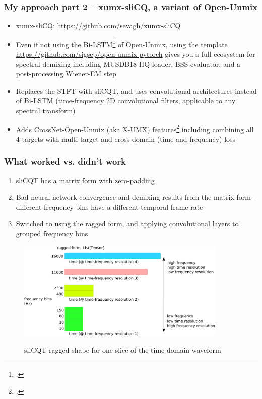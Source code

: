 \documentclass[usenames,dvipsnames]{beamer}
\begin{document}
\begin{frame}
	\frametitle{My approach part 2 -- xumx-sliCQ, a variant of Open-Unmix}
	\begin{itemize}
		\item
			xumx-sliCQ: \url{https://github.com/sevagh/xumx-sliCQ}
		\item
			Even if not using the Bi-LSTM\footcite{umx} of Open-Unmix, using the template \url{https://github.com/sigsep/open-unmix-pytorch} gives you a full ecosystem for spectral demixing including MUSDB18-HQ loader, BSS evaluator, and a post-processing Wiener-EM step
		\item
			Replaces the STFT with sliCQT, and uses convolutional architectures instead of Bi-LSTM (time-frequency 2D convolutional filters, applicable to any spectral transform)
		\item
			Adds CrossNet-Open-Unmix (aka X-UMX) features\footcite{xumx} including combining all 4 targets with multi-target and cross-domain (time and frequency) loss
	\end{itemize}
\end{frame}

\begin{frame}
	\frametitle{What worked vs. didn't work}
	\begin{enumerate}
		\item
			sliCQT has a matrix form with zero-padding
		\item
			Bad neural network convergence and demixing results from the matrix form -- different frequency bins have a different temporal frame rate
		\item
			Switched to using the ragged form, and applying convolutional layers to grouped frequency bins
	\end{enumerate}
	\begin{figure}[ht]
		\centering
		\includegraphics[width=10cm]{./images-blockdiagrams/slicq_shape.png}\\
		\caption{sliCQT ragged shape for one slice of the time-domain waveform}
	\end{figure}
\end{frame}
\end{document}
